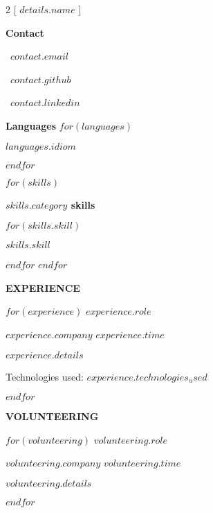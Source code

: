 \documentclass[a4paper]{article}
\begin{document}
\begin{multicols}{2}
[
\textcolor{mybluedark}{\textbf{\Huge{$details.name$}
\vspace{15mm} 
}}
]

\textcolor{myblue}{\large{\textbf{Contact}}}

\textcolor{myblue}{\faEnvelopeO \,}
\textcolor{mywhitetext}{$contact.email$}

\textcolor{myblue}{\faGithub \,}
\textcolor{mywhitetext}{\href{https://github.com/$contact.github$}{$contact.github$}}

\textcolor{myblue}{\faLinkedin \,}
\textcolor{mywhitetext}{\href{https://linkedin.com/in/$contact.linkedin$}{$contact.linkedin$}}
\hfill\break
\noindent

\textcolor{myblue}{\large\textbf{Languages}}
$for(languages)$

\textcolor{mywhitetext}{$languages.idiom$}

$endfor$
\vspace{5mm} 

$for(skills)$

\textcolor{myblue}{\large\textbf{$skills.category$ skills}}

$for(skills.skill)$

\textcolor{mywhitetext}{$skills.skill$}

$endfor$
\vspace{5mm} 
$endfor$

\columnbreak
\noindent
\textcolor{myblue}{\large\textbf{\sout{\hfill}EXPERIENCE\sout{\hfill}}}\break

$for(experience)$
\noindent
\textcolor{myblue}{\large\textbf{$experience.role$}}

\noindent
$experience.company$
\hfill
\noindent
\textit{\textcolor{mywhitetext}{$experience.time$}}


\noindent
\textcolor{mywhitetext}{$experience.details$}\hfill \break


\noindent
\textcolor{mywhitetext}{Technologies used: $experience.technologies_used$}\hfill \break

$endfor$

\noindent
\textcolor{myblue}{\large\textbf{\sout{\hfill}VOLUNTEERING\sout{\hfill}}}\break

$for(volunteering)$
\noindent
\textcolor{myblue}{\large\textbf{$volunteering.role$}}

\noindent
$volunteering.company$
\hfill
\noindent
\textit{\textcolor{mywhitetext}{$volunteering.time$}}

\noindent
\textcolor{mywhitetext}{$volunteering.details$} \hfill \break

	
$endfor$
\end{multicols}
\end{document}
